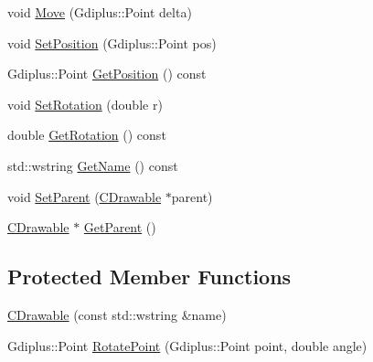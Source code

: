 \begin{DoxyCompactItemize}
\item 
void \hyperlink{class_c_drawable_a2241b02a5f50c7a455283a9fb24d5b27}{Move} (Gdiplus\+::\+Point delta)
\item 
void \hyperlink{class_c_drawable_aa6b8988df847a76c30dfcf525ab65449}{Set\+Position} (Gdiplus\+::\+Point pos)
\item 
Gdiplus\+::\+Point \hyperlink{class_c_drawable_ac1def1d34d8069e3985e3a423ba80f2d}{Get\+Position} () const 
\item 
void \hyperlink{class_c_drawable_ab1191ba99b869690839ff20cd0cc45c4}{Set\+Rotation} (double r)
\item 
double \hyperlink{class_c_drawable_afb31912cfe47cc336dfbef384181ca65}{Get\+Rotation} () const 
\item 
std\+::wstring \hyperlink{class_c_drawable_a45af045c285cd0be9340a9a0d9883260}{Get\+Name} () const 
\item 
void \hyperlink{class_c_drawable_ad53fc2430248f2ac022ab142024df983}{Set\+Parent} (\hyperlink{class_c_drawable}{C\+Drawable} $\ast$parent)
\item 
\hyperlink{class_c_drawable}{C\+Drawable} $\ast$ \hyperlink{class_c_drawable_a7f71959d8c597e34abb395b6dece5ad6}{Get\+Parent} ()
\end{DoxyCompactItemize}
\subsection*{Protected Member Functions}
\begin{DoxyCompactItemize}
\item 
\hyperlink{class_c_drawable_a2e153d7fd3a752139b0b87ea990a25fc}{C\+Drawable} (const std\+::wstring \&name)
\item 
Gdiplus\+::\+Point \hyperlink{class_c_drawable_aabf32ebc32a2dbe928bc9fa38bd82535}{Rotate\+Point} (Gdiplus\+::\+Point point, double angle)
\end{DoxyCompactItemize}
